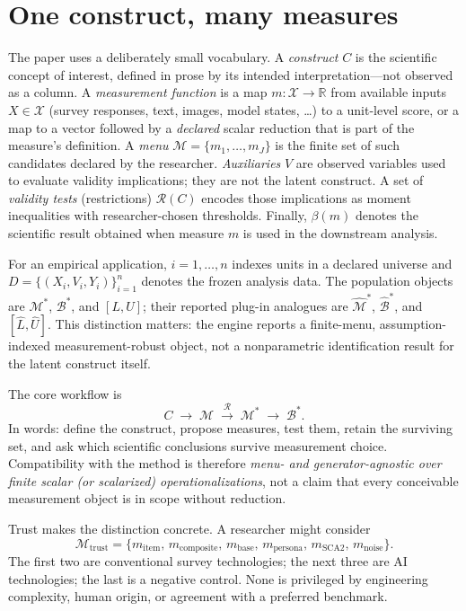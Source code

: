 \documentclass[10pt,letterpaper]{article}
\newcommand{\M}{\ensuremath{\mathcal{M}}}
\newcommand{\Rset}{\mathcal{R}}
\newcommand{\Bset}{\mathcal{B}}
\begin{document}
\section{One construct, many measures}
The paper uses a deliberately small vocabulary.
A \emph{construct} $C$ is the scientific concept of interest, defined in prose by its intended interpretation---not observed as a column.
A \emph{measurement function} is a map $m:\mathcal{X}\to\mathbb{R}$ from available inputs $X\in\mathcal{X}$ (survey responses, text, images, model states, \ldots) to a unit-level score, or a map to a vector followed by a \emph{declared} scalar reduction that is part of the measure's definition.
A \emph{menu} $\M=\{m_1,\ldots,m_J\}$ is the finite set of such candidates declared by the researcher.
\emph{Auxiliaries} $V$ are observed variables used to evaluate validity implications; they are not the latent construct.
A set of \emph{validity tests} (restrictions) $\Rset(C)$ encodes those implications as moment inequalities with researcher-chosen thresholds.
Finally, $\beta(m)$ denotes the scientific result obtained when measure $m$ is used in the downstream analysis.

For an empirical application, $i=1,\ldots,n$ indexes units in a declared universe and $D=\{(X_i,V_i,Y_i)\}_{i=1}^n$ denotes the frozen analysis data. The population objects are $\M^*$, $\Bset^*$, and $[L,U]$; their reported plug-in analogues are $\widehat{\M}^*$, $\widehat{\Bset}^*$, and $[\widehat L,\widehat U]$. This distinction matters: the engine reports a finite-menu, assumption-indexed measurement-robust object, not a nonparametric identification result for the latent construct itself.

The core workflow is
\begin{equation}
C \;\longrightarrow\; \M \;\xrightarrow{\;\Rset\;}\; \M^* \;\longrightarrow\; \Bset^*.
\label{eq:workflow}
\end{equation}
In words: define the construct, propose measures, test them, retain the surviving set, and ask which scientific conclusions survive measurement choice.
Compatibility with the method is therefore \emph{menu- and generator-agnostic over finite scalar (or scalarized) operationalizations}, not a claim that every conceivable measurement object is in scope without reduction.

Trust makes the distinction concrete.
A researcher might consider
\begin{equation}
\M_{\mathrm{trust}}=\bigl\{m_{\mathrm{item}},\, m_{\mathrm{composite}},\, m_{\mathrm{base}},\, m_{\mathrm{persona}},\, m_{\mathrm{SCA2}},\, m_{\mathrm{noise}}\bigr\}.
\label{eq:trustmenu}
\end{equation}
The first two are conventional survey technologies; the next three are AI technologies; the last is a negative control.
None is privileged by engineering complexity, human origin, or agreement with a preferred benchmark.
\end{document}
